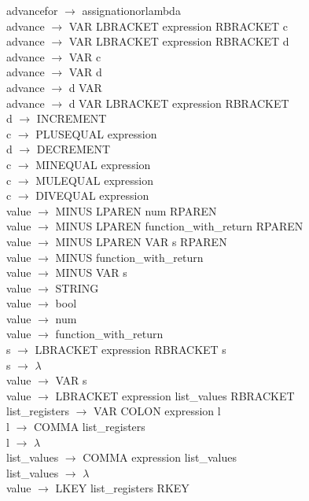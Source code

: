 \documentclass[10pt,a4paper]{article}
\begin{document}
advancefor $\rightarrow$ assignationorlambda \\
advance $\rightarrow$ VAR LBRACKET expression RBRACKET c \\
advance $\rightarrow$ VAR LBRACKET expression RBRACKET d \\
advance $\rightarrow$ VAR c \\
advance $\rightarrow$ VAR d \\
advance $\rightarrow$ d VAR \\
advance $\rightarrow$ d VAR LBRACKET expression RBRACKET \\
d $\rightarrow$ INCREMENT \\
c $\rightarrow$ PLUSEQUAL expression \\
d $\rightarrow$ DECREMENT \\
c $\rightarrow$ MINEQUAL expression \\
c $\rightarrow$ MULEQUAL expression \\
c $\rightarrow$ DIVEQUAL expression \\
value $\rightarrow$ MINUS LPAREN num RPAREN \\
value $\rightarrow$ MINUS LPAREN function\_with\_return RPAREN \\
value $\rightarrow$ MINUS LPAREN VAR s RPAREN \\
value $\rightarrow$ MINUS function\_with\_return \\
value $\rightarrow$ MINUS VAR s \\
value $\rightarrow$ STRING \\
value $\rightarrow$ bool \\
value $\rightarrow$ num \\
value $\rightarrow$ function\_with\_return \\
s $\rightarrow$ LBRACKET expression RBRACKET s \\
s $\rightarrow$ $\lambda$ \\
value $\rightarrow$ VAR s \\
value $\rightarrow$ LBRACKET expression list\_values RBRACKET \\
list\_registers $\rightarrow$ VAR COLON expression l \\
l $\rightarrow$ COMMA list\_registers \\
l $\rightarrow$ $\lambda$ \\
list\_values $\rightarrow$ COMMA expression list\_values \\
list\_values $\rightarrow$ $\lambda$ \\
value $\rightarrow$ LKEY list\_registers RKEY \\
\end{document}

